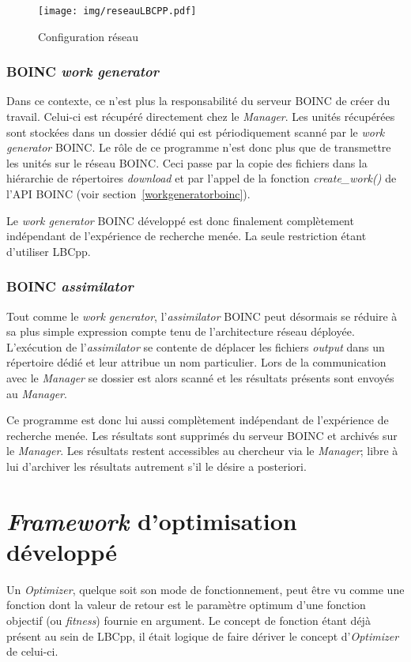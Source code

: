 \documentclass[a4paper, 11pt]{report}
\begin{document}
\begin{figure}[!h]
\centering
\texttt{[image: img/reseauLBCPP.pdf]}	
\caption{Configuration réseau}
\label{reseauLBCPP}
\end{figure}


\subsubsection{\textsc{BOINC} \textit{work generator}}
Dans ce contexte, ce n'est plus la responsabilité du serveur \textsc{BOINC} de créer du travail. Celui-ci est récupéré directement chez le \textit{Manager}. Les unités récupérées sont stockées dans un dossier dédié qui est périodiquement scanné par le \textit{work generator} \textsc{BOINC}. Le rôle de ce programme n'est donc plus que de transmettre les unités sur le réseau \textsc{BOINC}. Ceci passe par la copie des fichiers dans la hiérarchie de répertoires \textit{download} et par l'appel de la fonction \textit{create\_work()} de l'API \textsc{BOINC} (voir section~\ref{workgeneratorboinc}). 

Le \textit{work generator} \textsc{BOINC} développé est donc finalement complètement indépendant de l'expérience de recherche menée. La seule restriction étant d'utiliser LBCpp.


\subsubsection{\textsc{BOINC} \textit{assimilator}}
Tout comme le \textit{work generator}, l'\textit{assimilator} \textsc{BOINC} peut désormais se réduire à sa plus simple expression compte tenu de l'architecture réseau déployée. L'exécution de l'\textit{assimilator} se contente de déplacer les fichiers \textit{output} dans un répertoire dédié et leur attribue un nom particulier. Lors de la communication avec le \textit{Manager} se dossier est alors scanné et les résultats présents sont envoyés au \textit{Manager}.

Ce programme est donc lui aussi complètement indépendant de l'expérience de recherche menée. Les résultats sont supprimés du serveur \textsc{BOINC} et archivés sur le \textit{Manager}. Les résultats restent accessibles au chercheur via le \textit{Manager}; libre à lui d'archiver les résultats autrement s'il le désire a posteriori.


\section{\textit{Framework} d'optimisation développé}
\label{frameworkintro}
Un \textit{Optimizer}, quelque soit son mode de fonctionnement, peut être vu comme une fonction dont la valeur de retour est le paramètre optimum d'une fonction objectif (ou \textit{fitness}) fournie en argument. Le concept de fonction étant déjà présent au sein de LBCpp, il était logique de faire dériver le concept d'\textit{Optimizer} de celui-ci.
\end{document}
